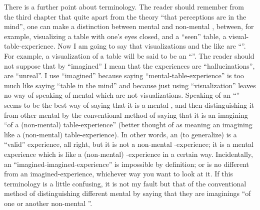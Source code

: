 There is a further point about terminology. The reader should 
remember from the third chapter that quite apart from the theory \enquote{that 
perceptions are in the mind}, one can make a distinction between mental 
and non-mental , between, for example, visualizing a table with 
one's eyes closed, and a \enquote{seen} table, a visual-table-experience. Now I am 
going to say that visualizations and the like are \enquote{}. For 
example, a visualization of a table will be said to be an 
\enquote{}. The reader should not suppose that by 
\enquote{imagined} I mean that the experiences are 
\enquote{hallucinations}, are \enquote{unreal}. I 
use \enquote{imagined} because saying \enquote{mental-table-experience} is too much like 
saying \enquote{table in the mind} and because just using \enquote{visualization} leaves no way 
of speaking of mental  which are not visualizations. Speaking of 
an \enquote{} seems to be the best way of saying that it is 
a mental , and then distinguishing it from other mental 
 by the conventional method of saying that it is an imagining \enquote{of 
a (non-mental) table-experience} (better thought of as meaning an imagining 
like a  (non-mental)  table-experience). In other words, an 
 (to generalize) is a \enquote{valid} experience, all right, but it 
is not a non-mental \x-experience; it is a mental experience which is like a 
(non-mental) \x-experience in a certain way. Incidentally, an \enquote{imagined-imagined-experience} is impossible by definition; or is no different from an 
imagined-experience, whichever way you want to look at it. If this 
terminology is a little confusing, it is not my fault but that of the 
conventional method of distinguishing different mental  by 
saying that they are imaginings \enquote{of one or another non-mental }. 

